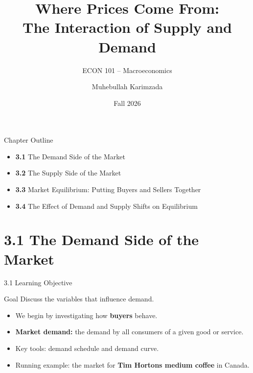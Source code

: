 \documentclass[aspectratio=169]{beamer}
\title{\textbf{Where Prices Come From:\\The Interaction of Supply and Demand}}
\subtitle{{\large ECON 101 -- Macroeconomics}}
\author{Muhebullah Karimzada}
\date{Fall 2026}
\begin{document}

\begin{frame}[plain]
  \titlepage
\end{frame}

\begin{frame}{Chapter Outline}
\transfade
\begin{itemize}
  \item \textbf{3.1} The Demand Side of the Market
  \item \textbf{3.2} The Supply Side of the Market
  \item \textbf{3.3} Market Equilibrium: Putting Buyers and Sellers Together
  \item \textbf{3.4} The Effect of Demand and Supply Shifts on Equilibrium
\end{itemize}
\end{frame}

\section{3.1 The Demand Side of the Market}

\begin{frame}{3.1 Learning Objective}
\transfade
\begin{block}{Goal}
Discuss the variables that influence demand.
\end{block}
\begin{itemize}
  \item We begin by investigating how \textbf{buyers} behave.
  \item \textbf{Market demand:} the demand by all consumers of a given good or service.
  \item Key tools: demand schedule and demand curve.
  \item Running example: the market for \textbf{Tim Hortons medium coffee} in Canada.
\end{itemize}
\end{frame}
\end{document}
